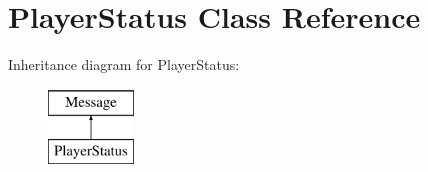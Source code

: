 \hypertarget{class_player_status}{\section{Player\-Status Class Reference}
\label{class_player_status}
}
Inheritance diagram for Player\-Status\-:\begin{figure}[H]
\begin{center}
\leavevmode
\includegraphics[height=2.000000cm]{class_player_status}
\end{center}
\end{figure}
